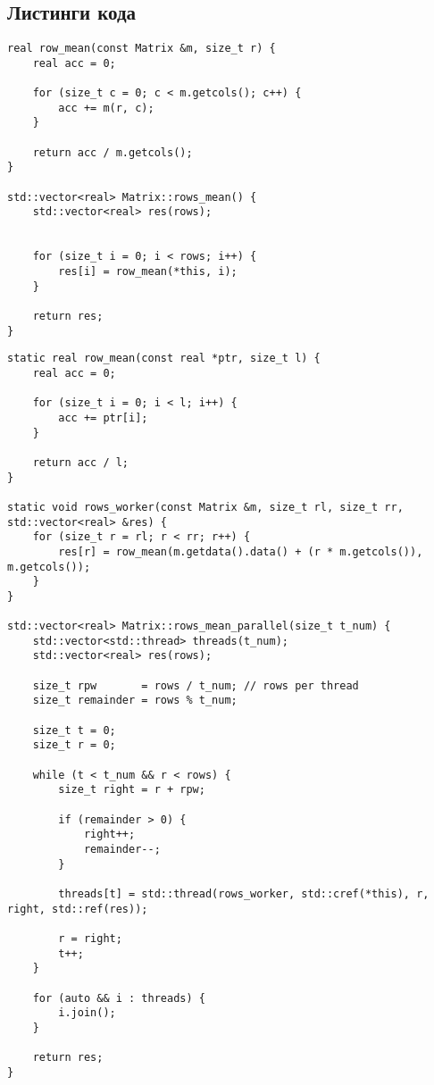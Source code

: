 \subsection{Листинги кода}

\begin{lstlisting}[caption=Последовательный алгоритм, label=list:iter, language={}]
real row_mean(const Matrix &m, size_t r) {
	real acc = 0;

	for (size_t c = 0; c < m.getcols(); c++) {
		acc += m(r, c);
	}

	return acc / m.getcols();
}

std::vector<real> Matrix::rows_mean() {
	std::vector<real> res(rows);


	for (size_t i = 0; i < rows; i++) {
		res[i] = row_mean(*this, i);
	}

	return res;
}
\end{lstlisting}

\begin{lstlisting}[caption=Параллельный алгоритм, label=list:iter, language={}]
static real row_mean(const real *ptr, size_t l) {
    real acc = 0;

    for (size_t i = 0; i < l; i++) {
        acc += ptr[i];
    }

    return acc / l;
}

static void rows_worker(const Matrix &m, size_t rl, size_t rr, std::vector<real> &res) {
    for (size_t r = rl; r < rr; r++) {
        res[r] = row_mean(m.getdata().data() + (r * m.getcols()), m.getcols());
    }
}

std::vector<real> Matrix::rows_mean_parallel(size_t t_num) {
    std::vector<std::thread> threads(t_num);
    std::vector<real> res(rows);

    size_t rpw       = rows / t_num; // rows per thread
    size_t remainder = rows % t_num;

    size_t t = 0;
    size_t r = 0;

    while (t < t_num && r < rows) {
        size_t right = r + rpw;

        if (remainder > 0) {
            right++;
            remainder--;
        }

        threads[t] = std::thread(rows_worker, std::cref(*this), r, right, std::ref(res));
        
        r = right;
        t++;
    }

    for (auto && i : threads) {
        i.join();
    }

    return res;
}
\end{lstlisting}

